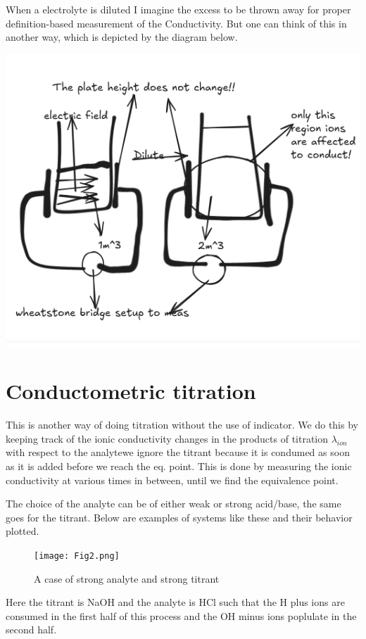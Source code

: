 \documentclass[12pt]{article}
\begin{document}
{When a electrolyte is diluted I imagine the excess to be thrown away for proper definition-based measurement of the Conductivity. But one can think of this in another way, which is depicted by the diagram below.

\includegraphics{Fig1.png}

\section*{Conductometric titration}
This is another way of doing titration without the use of indicator. We do this by keeping track of the ionic conductivity changes in the products of titration $\lambda_{ion}$ with respect to the analyte{we ignore the titrant because it is condumed as soon as it is added before we reach the eq. point}. This is done by measuring the ionic conductivity at various times in between, until we find the equivalence point.

The choice of the analyte can be of either weak or strong acid/base, the same goes for the titrant. Below are examples of systems like these and their behavior plotted.

\begin{figure}
\centering
\texttt{[image: Fig2.png]}
\caption{A case of strong analyte and strong titrant}
\end{figure}

Here the titrant is NaOH and the analyte is HCl such that the H plus ions are consumed in the first half of this process and the OH minus ions poplulate in the second half.

}
\end{document}
